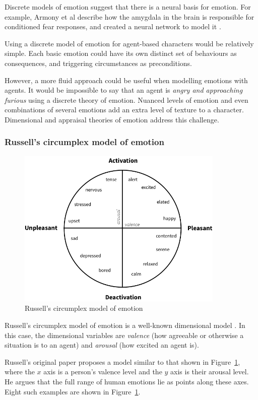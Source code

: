 \documentclass[11pt]{report}
\begin{document}
Discrete models of emotion suggest that there is a neural basis for emotion. For example, Armony et al describe how the amygdala in the brain is responsible for conditioned fear responses, and created a neural network to model it \citep{armony1997computational}.

Using a discrete model of emotion for agent-based characters would be relatively simple. Each basic emotion could have its own distinct set of behaviours as consequences, and triggering circumstances as preconditions.

However, a more fluid approach could be useful when modelling emotions with agents. It would be impossible to say that an agent is \emph{angry and approaching furious} using a discrete theory of emotion. Nuanced levels of emotion and even combinations of several emotions add an extra level of texture to a character. Dimensional and appraisal theories of emotion address this challenge.

\subsubsection{Russell's circumplex model of emotion}\label{sec:circumplex}
\begin{figure}[!t]
\centerline{\includegraphics[height=3in]{circumplex.png}}
\caption{Russell's circumplex model of emotion} \label{fig:circumplex}
\end{figure}

Russell's circumplex model of emotion is a well-known dimensional model \citep{russell1980circumplex}. In this case, the dimensional variables are \emph{valence} (how agreeable or otherwise a situation is to an agent) and \emph{arousal} (how excited an agent is).

Russell's original paper proposes a model similar to that shown in Figure~\ref{fig:circumplex}, where the $x$ axis is a person's valence level and the $y$ axis is their arousal level. He argues that the full range of human emotions lie as points along these axes. Eight such examples are shown in Figure~\ref{fig:circumplex}.
\end{document}

